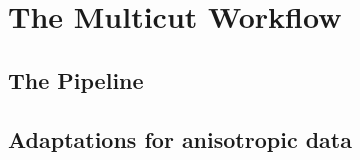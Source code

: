 
\chapter{The Multicut Workflow} %

\label{Chapter3}

\section{The Pipeline}

\section{Adaptations for anisotropic data}
